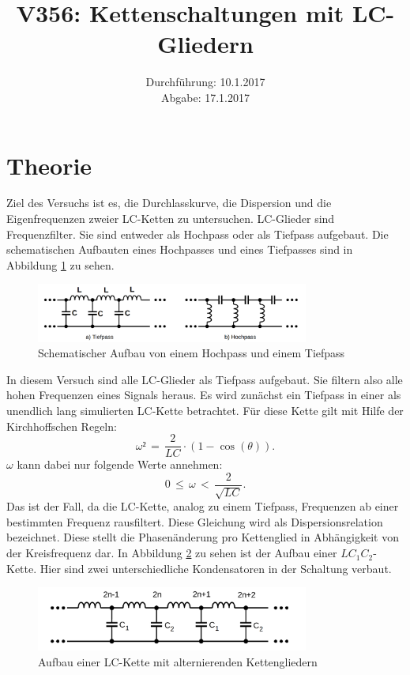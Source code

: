 \documentclass[
  bibliography=totoc,     %
  captions=tableheading,  %
  titlepage=firstiscover, %
]{scrartcl}
\title{V356: Kettenschaltungen mit LC-Gliedern}
\author{
  Simon Schulte
  \texorpdfstring{
    \\
    \href{mailto:simon.schulte@udo.edu}{simon.schulte@udo.edu}
  }{}
  \texorpdfstring{\and}{, }
  Tim Sedlaczek
  \texorpdfstring{
    \\
    \href{mailto:tim.sedlaczek@udo.edu}{tim.sedlaczek@udo.edu}
  }{}
}
\date{Durchführung: 10.1.2017\\
      Abgabe: 17.1.2017}
\begin{document}
\maketitle
\thispagestyle{empty}
\tableofcontents
\newpage
\section{Theorie}
\label{theorie}
Ziel des Versuchs ist es, die Durchlasskurve, die Dispersion und die
Eigenfrequenzen zweier LC-Ketten zu untersuchen.
LC-Glieder sind Frequenzfilter. Sie sind entweder als Hochpass oder als Tiefpass
aufgebaut. Die schematischen Aufbauten eines Hochpasses und eines Tiefpasses sind
in Abbildung \ref{fig:V3561} zu sehen.
\begin{figure}[htb]
  \centering
  \includegraphics[width=0.8\textwidth]{V3561.png}
  \caption{Schematischer Aufbau von einem Hochpass und einem Tiefpass }
  \label{fig:V3561}
\end{figure}
In diesem Versuch sind alle LC-Glieder als Tiefpass aufgebaut. Sie filtern also
alle hohen Frequenzen eines Signals heraus. Es wird zunächst ein Tiefpass in
einer als unendlich lang simulierten LC-Kette betrachtet. Für diese Kette gilt
mit Hilfe der Kirchhoffschen Regeln:
\begin{equation}
  \omega²\,=\,\frac{2}{LC}\cdot(1-\cos(\theta)).
  \label{eqn:dispersionsrelationLC}
\end{equation}
$\omega$ kann dabei nur folgende Werte annehmen:
\begin{equation}
  0\,\le\,\omega\,<\,\frac{2}{\sqrt{LC}}.
  \label{eqn:grenzwertdispersLC}
\end{equation}
Das ist der Fall, da die LC-Kette, analog zu einem Tiefpass, Frequenzen ab einer
bestimmten Frequenz rausfiltert.
Diese Gleichung wird als Dispersionsrelation bezeichnet. Diese stellt die
Phasenänderung pro Kettenglied in Abhängigkeit von der Kreisfrequenz dar.
In Abbildung \ref{fig:V3562} zu sehen ist der Aufbau einer $LC_1C_2$-Kette.
Hier sind zwei unterschiedliche Kondensatoren in der Schaltung verbaut.
\begin{figure}[htb]
  \centering
  \includegraphics[width=0.8\textwidth]{V3562.png}
  \caption{Aufbau einer LC-Kette mit alternierenden Kettengliedern }
  \label{fig:V3562}
\end{figure}
\end{document}
